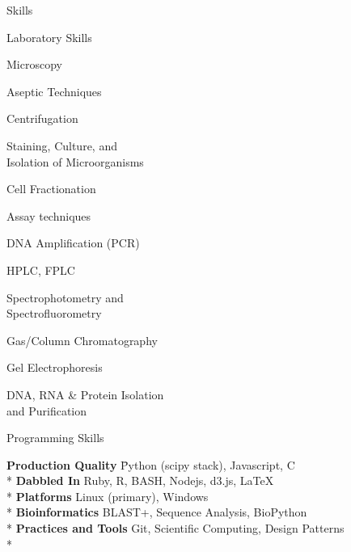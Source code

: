 \documentclass{article}
\newlength{\tabin}
\newlength{\secsep}
\newcommand{\lineunder}{\vspace*{-8pt} \\ \hspace*{-6pt} \hrulefill \\ \vspace*{-15pt}}
\newenvironment{tabbedsection}[1]{
  \begin{list}{}{
      \setlength{\itemsep}{0pt}
      \setlength{\labelsep}{0pt}
      \setlength{\labelwidth}{0pt}
      \setlength{\leftmargin}{\tabin}
      \setlength{\rightmargin}{\tabin}
      \setlength{\listparindent}{0pt}
      \setlength{\parsep}{0pt}
      \setlength{\parskip}{0pt}
      \setlength{\partopsep}{0pt}
      \setlength{\topsep}{#1}
    }
  \item[]
}{\end{list}}
\newenvironment{nospacetabbing}{
    \begin{tabbing}
}{\end{tabbing}\vspace{-1.2em}}
\newenvironment{resume_section}[1]{
  \filbreak
  \vspace{2\secsep}
  \textsc{\large#1}
  \lineunder
  \begin{tabbedsection}{\secsep}
}{\end{tabbedsection}}
\newenvironment{resume_subsection}[2][]{
  \textbf{#2} \hfill {\footnotesize #1} \hspace{1.0em}
  \begin{tabbedsection}{0.5\secsep}
}{\end{tabbedsection}}
\newenvironment{subitems}{
  \renewcommand{\labelitemi}{$\cdot$}
  \begin{itemize}
      \setlength{\labelsep}{1em}
}{\end{itemize}}
\begin{document}
\begin{resume_section}{Skills}
    \begin{resume_subsection}[]{Laboratory Skills}
    \vspace*{-8pt}
    \begin{subitems}
        \begin{multicols}{3}
        \item Microscopy
        \item Aseptic Techniques
        \item Centrifugation
        \item Staining, Culture, and \\ Isolation of Microorganisms
        \item Cell Fractionation
        \item Assay techniques
        \item DNA Amplification (PCR)
        \item HPLC, FPLC
        \item Spectrophotometry and \\ Spectrofluorometry
        \item Gas/Column Chromatography
        \item Gel Electrophoresis
        \item DNA, RNA \& Protein Isolation \\ and Purification
        \end{multicols}
    \end{subitems}
    \end{resume_subsection}
\begin{resume_subsection}{Programming Skills}
  \begin{nospacetabbing}
  \textbf{Production Quality} \= Python (scipy stack), Javascript, C\\*
  \textbf{Dabbled In} \> Ruby, R, BASH, Nodejs, d3.js, \LaTeX \\*
  \textbf{Platforms} \> Linux (primary), Windows\\*
  \textbf{Bioinformatics} \> BLAST+, Sequence Analysis, BioPython\\*
  \textbf{Practices and Tools} \> Git, Scientific Computing, Design Patterns\\*
  \end{nospacetabbing}
\end{resume_subsection}
\end{resume_section}
\end{document}

